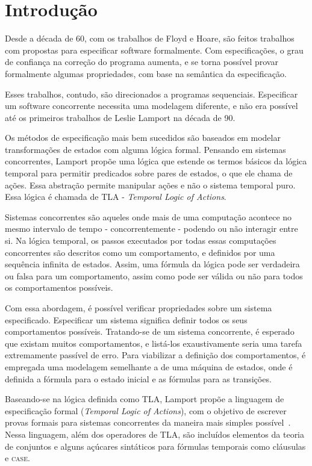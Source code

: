 \chapter{Introdução}
\label{introducao}

Desde a década de 60, com os trabalhos de Floyd e Hoare, são feitos trabalhos com propostas para especificar software formalmente. Com especificações, o grau de confiança na correção do programa aumenta, e se torna possível provar formalmente algumas propriedades, com base na semântica da especificação.

Esses trabalhos, contudo, são direcionados a programas sequenciais. Especificar um software concorrente necessita uma modelagem diferente, e não era possível até os primeiros trabalhos de Leslie Lamport na década de 90.

Os métodos de especificação mais bem sucedidos são baseados em modelar transformações de estados com alguma lógica formal. Pensando em sistemas concorrentes, Lamport propõe uma lógica que estende os termos básicos da lógica temporal para permitir predicados sobre pares de estados, o que ele chama de ações. Essa abstração permite manipular ações e não o sistema temporal puro. Essa lógica é chamada de TLA - \textit{Temporal Logic of Actions}.

Sistemas concorrentes são aqueles onde mais de uma computação acontece no mesmo intervalo de tempo - concorrentemente - podendo ou não interagir entre si. Na lógica temporal, os passos executados por todas essas computações concorrentes são descritos como um comportamento, e definidos por uma sequência infinita de estados. Assim, uma fórmula da lógica pode ser verdadeira ou falsa para um comportamento, assim como pode ser válida ou não para todos os comportamentos possíveis.

Com essa abordagem, é possível verificar propriedades sobre um sistema especificado. Especificar um sistema significa definir todos os seus comportamentos possíveis. Tratando-se de um sistema concorrente, é esperado que existam muitos comportamentos, e listá-los exaustivamente seria uma tarefa extremamente passível de erro. Para viabilizar a definição dos comportamentos, é empregada uma modelagem semelhante a de uma máquina de estados, onde é definida a fórmula para o estado inicial e as fórmulas para as transições.

Baseando-se na lógica definida como TLA, Lamport propõe a linguagem de especificação formal \TLA (\textit{Temporal Logic of Actions}), com o objetivo de escrever provas formais para sistemas concorrentes da maneira mais simples possível~\cite{tlahistory}. Nessa linguagem, além dos operadores de TLA, são incluídos elementos da teoria de conjuntos e alguns açúcares sintáticos para fórmulas temporais como cláusulas \IF e \textsc{case}.

